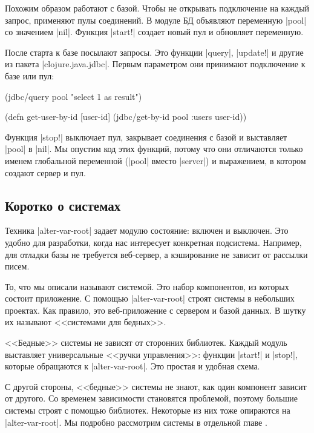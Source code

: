 Похожим образом работают с базой. Чтобы не открывать подключение на каждый
запрос, применяют пулы соединений. В модуле БД объявляют переменную
\spverb|pool| со значением \spverb|nil|. Функция \spverb|start!| создает новый
пул и обновляет переменную.

После старта к базе посылают запросы. Это функции \spverb|query|,
\spverb|update!| и другие из пакета \spverb|clojure.java.jdbc|. Первым
параметром они принимают подключение к базе или пул:

\begin{english}
  \begin{clojure}
(jdbc/query pool "select 1 as result")

(defn get-user-by-id [user-id]
  (jdbc/get-by-id pool :users user-id))
  \end{clojure}
\end{english}

Функция \spverb|stop!| выключает пул, закрывает соединения с базой и выставляет
\spverb|pool| в \spverb|nil|. Мы опустим код этих функций, потому что они
отличаются только именем глобальной переменной (\spverb|pool| вместо
\spverb|server|) и выражением, в котором создают сервер и пул.

\subsection{Коротко о системах}

\label{systems-intro}

Техника \spverb|alter-var-root| задает модулю состояние: включен и выключен. Это
удобно для разработки, когда нас интересует конкретная подсистема. Например, для
отладки базы не требуется веб-сервер, а кэширование не зависит от рассылки
писем.

То, что мы описали называют системой. Это набор компонентов, из которых состоит
приложение. С помощью \spverb|alter-var-root| строят системы в небольших
проектах. Как правило, это веб-приложение с сервером и базой данных. В шутку их
называют <<системами для бедных>>.

<<Бедные>> системы не зависят от сторонних библиотек. Каждый модуль выставляет
универсальные <<ручки управления>>: функции \spverb|start!| и \spverb|stop!|,
которые обращаются к \spverb|alter-var-root|. Это простая и удобная схема.

С другой стороны, <<бедные>> системы не знают, как один компонент зависит от
другого. Со временем зависимости становятся проблемой, поэтому большие системы
строят с помощью библиотек. Некоторые из них тоже опираются на
\spverb|alter-var-root|. Мы подробно рассмотрим системы в отдельной
главе .

